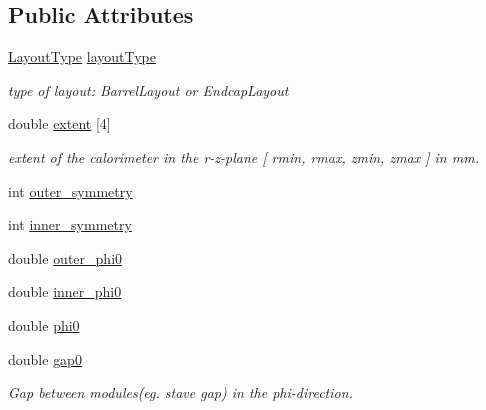 \subsection*{Public Attributes}
\begin{DoxyCompactItemize}
\item 
\hyperlink{struct_d_d4hep_1_1_d_d_rec_1_1_layered_calorimeter_struct_a560e60d5a6a1671ab8b21629714b4d36}{LayoutType} \hyperlink{struct_d_d4hep_1_1_d_d_rec_1_1_layered_calorimeter_struct_a141e4dca7fb6f24249a79912e18e964d}{layoutType}
\begin{DoxyCompactList}\small\item\em type of layout: BarrelLayout or EndcapLayout \item\end{DoxyCompactList}\item 
double \hyperlink{struct_d_d4hep_1_1_d_d_rec_1_1_layered_calorimeter_struct_ae15cea59aab1ff3db73f1e981d13c6cc}{extent} \mbox{[}4\mbox{]}
\begin{DoxyCompactList}\small\item\em extent of the calorimeter in the r-\/z-\/plane \mbox{[} rmin, rmax, zmin, zmax \mbox{]} in mm. \item\end{DoxyCompactList}\item 
int \hyperlink{struct_d_d4hep_1_1_d_d_rec_1_1_layered_calorimeter_struct_a6adea28c87118351ef0854a54ed106b5}{outer\_\-symmetry}
\item 
int \hyperlink{struct_d_d4hep_1_1_d_d_rec_1_1_layered_calorimeter_struct_a94ead288a528b23775bde06ccfd00e99}{inner\_\-symmetry}
\item 
double \hyperlink{struct_d_d4hep_1_1_d_d_rec_1_1_layered_calorimeter_struct_a4fa8650165dff7097401fa4a6de40f89}{outer\_\-phi0}
\item 
double \hyperlink{struct_d_d4hep_1_1_d_d_rec_1_1_layered_calorimeter_struct_a5ea761ee743ac216f442d91f97d82516}{inner\_\-phi0}
\item 
double \hyperlink{struct_d_d4hep_1_1_d_d_rec_1_1_layered_calorimeter_struct_a1c5124161001b81077ce44414cfe046d}{phi0}
\item 
double \hyperlink{struct_d_d4hep_1_1_d_d_rec_1_1_layered_calorimeter_struct_aab4f81fe9fc897a94eadbd59ff308bdb}{gap0}
\begin{DoxyCompactList}\small\item\em Gap between modules(eg. stave gap) in the phi-\/direction. \item\end{DoxyCompactList}\item 

\end{DoxyCompactItemize}
